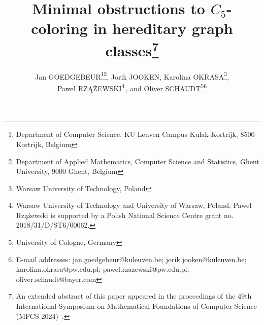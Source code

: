 \documentclass[11pt,a4paper]{article}
\theoremstyle{mystyle}
\begin{document}
\title{Minimal obstructions to $C_5$-coloring in hereditary graph classes\footnote{An extended abstract of this paper appeared in the proceedings of the 49th International Symposium on Mathematical Foundations of Computer Science (MFCS 2024)~\cite{MFCS2024}.}}
\author{{\sc Jan GOEDGEBEUR\footnote{Department of Computer Science, KU Leuven Campus Kulak-Kortrijk, 8500 Kortrijk, Belgium}\;\footnote{Department of Applied Mathematics, Computer Science and Statistics, Ghent University, 9000 Ghent, Belgium}\;,
Jorik JOOKEN\footnotemark[1]\;,
Karolina OKRASA\footnote{Warsaw University of Technology, Poland}\;, }\\[1mm]
Pawe{\l} \MakeUppercase{Rz{\k{a}}{\.z}ewski}\footnote{Warsaw University of Technology and University of Warsaw, Poland. Pawe{\l} Rz{\k{a}}{\.z}ewski is supported by a Polish National Science Centre grant no. 2018/31/D/ST6/00062.}\;\,,
and {Oliver SCHAUDT\footnote{University of Cologne, Germany}}\;\footnote{E-mail addresses: jan.goedgebeur@kuleuven.be; jorik.jooken@kuleuven.be; karolina.okrasa@pw.edu.pl; pawel.rzazewski@pw.edu.pl;
oliver.schaudt@bayer.com}}
\date{}

\maketitle
\end{document}
